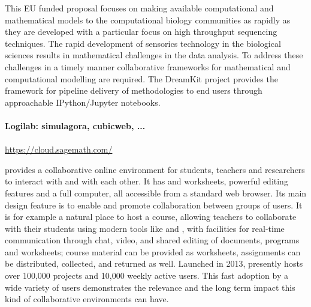 
This EU funded proposal focuses on making available computational and mathematical models to the computational biology communities as rapidly as they are developed with a particular focus on high throughput sequencing techniques. The rapid development of sensorics technology in the biological sciences results in mathematical challenges in the data analysis. To address these challenges in a timely manner collaborative frameworks for mathematical and computational modelling are required. The DreamKit project provides the framework for pipeline delivery of methodologies to end users through approachable IPython/Jupyter notebooks. 


\paragraph{Logilab: simulagora, cubicweb, ...}


\paragraph{\SMC} \url{https://cloud.sagemath.com/}



\SMC provides a collaborative online environment for students,
teachers and researchers to interact with \Sage and with each
other. It has \Sage and \IPython worksheets, powerful \LATEX editing
features and a full \Linux computer, all accessible from a standard
web browser. Its main design feature is to enable and promote
collaboration between groups of users. It is for example a natural
place to host a course, allowing teachers to collaborate with their
students using modern tools like \Sage and \LATEX, with facilities for
real-time communication through chat, video, and shared editing of
documents, programs and worksheets; course material can be provided as
worksheets, assignments can be distributed, collected, and returned as
well. Launched in 2013, \SMC presently hosts over 100,000 projects and
10,000 weekly active users. This fast adoption by a wide variety of
users demonstrates the relevance and the long term impact this kind of
collaborative environments can have.

